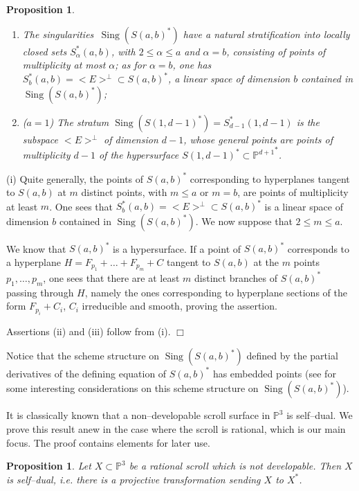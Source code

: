 \documentclass[11pt]{article}   %
\newtheorem{Proposition}[Theorem]{Proposition}
\theoremstyle{definition}
\numberwithin{Theorem}{section} \numberwithin{equation}{section}
\def\demo{\noindent{\it Proof. }}
\def\QED{\hfill$\Box$}
\def\qed{\QED}
\newcommand{\Sing}{\operatorname{Sing}}
\newcommand{\p}{{\mathbb P}}
\begin{document}
{\begin{Proposition}
\begin{enumerate}
\item[{\rm (ii)}] The singularities $\,\Sing(S(a,b)^ *)$ have a natural
stratification into locally closed sets $S^*_{\alpha}(a,b)$, with $2\leq \alpha\leq
a$ and $\alpha=b$, consisting of points of multiplicity at most
$\alpha$; as for $\alpha=b$, one has $S^*_{b}(a,b)=<E>^\perp\subset
S(a,b)^ *$, a linear space of dimension $b$ contained in
$\Sing(S(a,b)^ *)${\rm ;}
\item[{\rm (iii)}] {\rm (}$a=1${\rm )} The stratum
$\Sing(S(1,d-1)^*)=S^ *_{d-1}(1,d-1)$ is the subspace $<E>^ \perp$
of dimension $d-1$, whose general points are points of multiplicity
$d-1$ of the hypersurface $S(1,d-1)^*\subset {\p^{d+1}}^*$.
\end{enumerate}
\end{Proposition}
\demo  (i) Quite generally, the points of $S(a,b)^ *$ corresponding
to hyperplanes tangent to $S(a,b)$ at $m$ distinct points, with
$m\leq a$ or $m=b$, are points of multiplicity at least $m$. One
sees that $S^*_{b}(a,b)=<E>^\perp\subset S(a,b)^ *$ is a linear space of
dimension $b$ contained in $\Sing(S(a,b)^ *)$. We now suppose that $2\leq
m\leq a$.

We know that $S(a,b)^*$ is a hypersurface. If a point of $S(a,b)^*$
corresponds to a hyperplane $H=F_{p_1}+\ldots+F_{p_m}+C$ tangent to
$S(a,b)$ at the $m$ points $p_1,\ldots, p_m$, one sees that there
are at least $m$ distinct branches of $S(a,b)^*$ passing
through $H$, namely the ones corresponding to hyperplane sections of
the form $F_{p_i}+C_i$, $C_i$ irreducible and smooth, proving the
assertion.


Assertions (ii) and (iii) follow from (i).
 \qed

\medskip

Notice that the scheme structure on $\Sing(S(a,b)^*)$ defined by the
partial derivatives of the defining equation of $S(a,b)^*$ has
embedded points (see \cite{Aluffi} for some interesting
considerations on this scheme structure on $\Sing(S(a,b)^*)$).

It is { classically known}
 that a non--developable scroll surface in $\p^3$  is self--dual. We prove this result anew in the case
where the scroll is rational, which is our  main focus. The proof
contains elements for later use.

\begin{Proposition}\label{autodual} Let $X\subset \p^ 3$ be a rational scroll which
is not developable. Then
$X$ is self--dual, i.e. there is a projective transformation sending $X$ to $X^ *$.
\end{Proposition}

}
\end{document}
